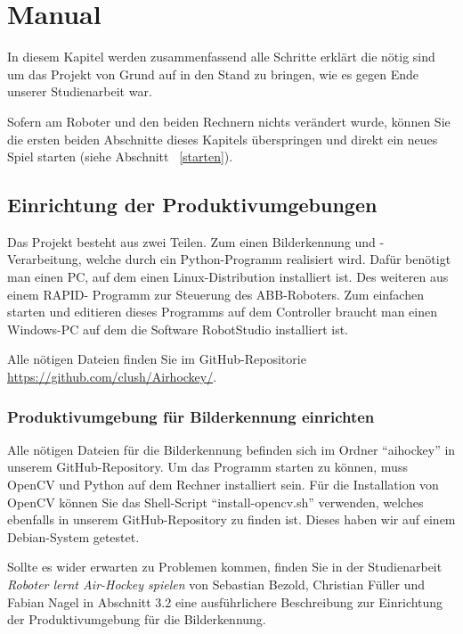 
\chapter{Manual}

In diesem Kapitel werden zusammenfassend alle Schritte erklärt die nötig sind um das Projekt von Grund auf in den Stand zu bringen, wie es gegen Ende unserer Studienarbeit war.

Sofern am Roboter und den beiden Rechnern nichts verändert wurde, können Sie die ersten beiden Abschnitte dieses Kapitels überspringen und direkt ein neues Spiel starten (siehe Abschnitt ~\ref{starten}). 

\section{Einrichtung der Produktivumgebungen}

Das Projekt besteht aus zwei Teilen. Zum einen Bilderkennung und -Verarbeitung, welche durch ein Python-Programm realisiert wird. Dafür benötigt man einen PC, auf dem einen Linux-Distribution installiert ist. Des weiteren aus einem RAPID- Programm zur Steuerung des ABB-Roboters. Zum einfachen starten und editieren dieses Programms auf dem Controller braucht man einen Windows-PC auf dem die Software RobotStudio installiert ist. 

Alle nötigen Dateien finden Sie im GitHub-Repositorie \href{https://github.com/clush/Airhockey/}{https://github.com/clush/Airhockey/}.  

\subsection{Produktivumgebung für Bilderkennung einrichten}
Alle nötigen Dateien für die Bilderkennung befinden sich im Ordner \enquote{aihockey} in unserem GitHub-Repository. Um das Programm starten zu können, muss OpenCV und Python auf dem Rechner installiert sein. Für die Installation von OpenCV können Sie das Shell-Script \enquote{install-opencv.sh} verwenden, welches ebenfalls in unserem GitHub-Repository zu finden ist. Dieses haben wir auf einem Debian-System getestet. 

Sollte es wider erwarten zu Problemen kommen, finden Sie in der Studienarbeit \textit{Roboter lernt Air-Hockey spielen} von Sebastian Bezold, Christian Füller und Fabian Nagel in Abschnitt 3.2 eine ausführlichere Beschreibung zur Einrichtung der Produktivumgebung für die Bilderkennung.

